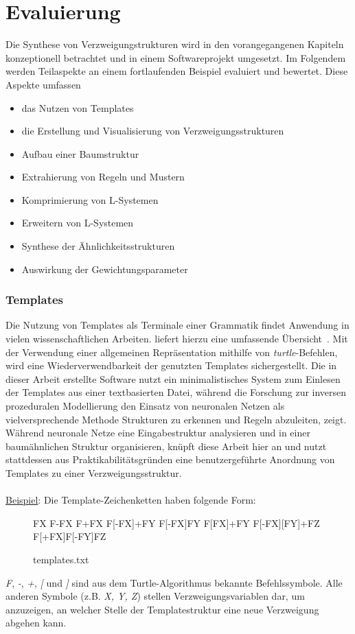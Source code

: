 
\chapter{Evaluierung}
Die Synthese von Verzweigungstrukturen wird in den vorangegangenen Kapiteln konzeptionell betrachtet
und in einem Softwareprojekt umgesetzt.
Im Folgendem werden Teilaspekte an einem fortlaufenden Beispiel evaluiert und bewertet.
Diese Aspekte umfassen
\begin{itemize}
    \item das Nutzen von Templates
    \item die Erstellung und Visualisierung von Verzweigungsstrukturen
    \item Aufbau einer Baumstruktur
    \item Extrahierung von Regeln und Mustern
    \item Komprimierung von L-Systemen
    \item Erweitern von L-Systemen
    \item Synthese der Ähnlichkeitsstrukturen
    \item Auswirkung der Gewichtungsparameter
\end{itemize}

\subsection*{Templates}
Die Nutzung von Templates als Terminale einer Grammatik findet Anwendung in vielen wissenschaftlichen Arbeiten.
\citeauthor{aliaga_2016} liefert hierzu eine umfassende Übersicht~\cite{aliaga_2016}.
Mit der Verwendung einer allgemeinen Repräsentation mithilfe von \textit{turtle}-Befehlen, wird eine
Wiederverwendbarkeit der genutzten Templates sichergestellt.
Die in dieser Arbeit erstellte Software nutzt ein minimalistisches System zum Einlesen der Templates aus
einer textbasierten Datei, während die Forschung zur inversen prozeduralen Modellierung den Einsatz von
neuronalen Netzen als vielversprechende Methode Strukturen zu erkennen und Regeln abzuleiten, zeigt.\\
Während neuronale Netze eine Eingabestruktur analysieren und in einer baumähnlichen Struktur organisieren,
knüpft diese Arbeit hier an und nutzt stattdessen aus Praktikabilitätsgründen eine benutzergeführte Anordnung
von Templates zu einer Verzweigungsstruktur.\\~\\
\underline{Beispiel}: Die Template-Zeichenketten haben folgende Form:
\begin{figure}[H]
    \centering
    \begin{csource}
    FX
    F-FX
    F+FX
    F[-FX]+FY
    F[-FX]FY
    F[FX]+FY
    F[-FX][FY]+FZ
    F[+FX]F[-FY]FZ
    \end{csource}
    \caption{templates.txt}
\end{figure}
\textit{F}, \textit{-}, \textit{+}, \textit{[} und \textit{]} sind aus dem Turtle-Algorithmus bekannte
Befehlssymbole.
Alle anderen Symbole (z.B. \textit{X, Y, Z}) stellen Verzweigungsvariablen dar, um anzuzeigen, an welcher Stelle
der Templatestruktur eine neue Verzweigung abgehen kann.

